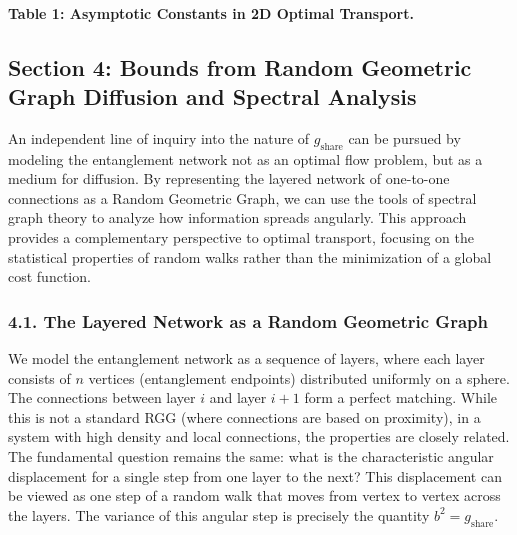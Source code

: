 \documentclass[11pt]{article}
\begin{document}
\paragraph{Table 1: Asymptotic Constants in 2D Optimal Transport.}
\begin{center}
\end{center}

\subsection*{Section 4: Bounds from Random Geometric Graph Diffusion and Spectral Analysis}
An independent line of inquiry into the nature of $g_{\mathrm{share}}$ can be pursued by modeling the entanglement network not as an optimal flow problem, but as a medium for diffusion. By representing the layered network of one-to-one connections as a Random Geometric Graph, we can use the tools of spectral graph theory to analyze how information spreads angularly. This approach provides a complementary perspective to optimal transport, focusing on the statistical properties of random walks rather than the minimization of a global cost function.

\subsubsection*{4.1. The Layered Network as a Random Geometric Graph}
We model the entanglement network as a sequence of layers, where each layer consists of $n$ vertices (entanglement endpoints) distributed uniformly on a sphere. The connections between layer $i$ and layer $i{+}1$ form a perfect matching. While this is not a standard RGG (where connections are based on proximity), in a system with high density and local connections, the properties are closely related. The fundamental question remains the same: what is the characteristic angular displacement for a single step from one layer to the next? This displacement can be viewed as one step of a random walk that moves from vertex to vertex across the layers. The variance of this angular step is precisely the quantity $b^2 = g_{\mathrm{share}}$.
\end{document}
